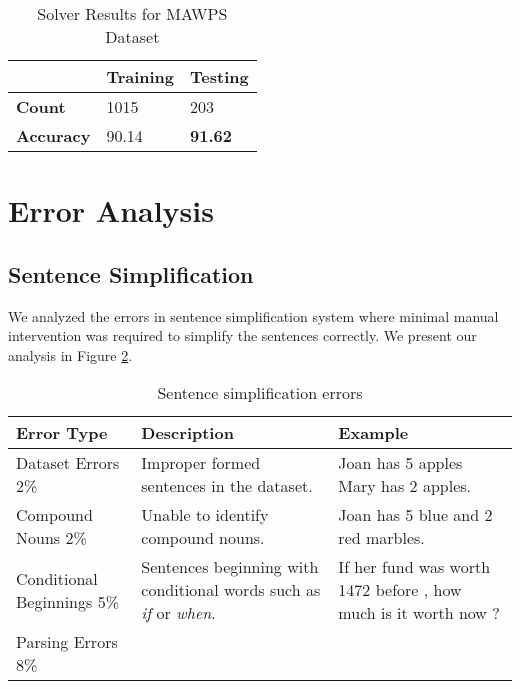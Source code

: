 \documentclass[11pt]{article}
\begin{document}
\begin{table}[H]
\centering
\begin{tabular}{|m{3cm}|m{2cm}|m{1.5cm}|}
\hline
 & \textbf{Training} & \textbf{Testing} \\ \hline
 \textbf{Count} & 1015 & 203 \\ \hline
 \textbf{Accuracy} & 90.14 & \textbf{91.62} \\ \hline
\end{tabular}
\caption{Solver Results for MAWPS Dataset}
\label{figure:14}
\end{table}

\section{Error Analysis}
\subsection{Sentence Simplification}
We analyzed the errors in sentence simplification system where minimal manual intervention was required to simplify the sentences correctly. We present our analysis in Figure \ref{figure:15}. 

\begin{table}[h!]
\centering
\begin{tabular}{|m{2cm}|m{2cm}|m{2cm}|}
\hline
\textbf{Error Type} & \textbf{Description} & \textbf{Example}  \\ \hline
Dataset Errors 2\% & Improper formed sentences in the dataset. & Joan has 5 apples Mary has 2 apples. \\ \hline
Compound Nouns 2\% & Unable to identify compound nouns. & Joan has 5 blue and 2 red marbles. \\ \hline
Conditional Beginnings 5\% & Sentences beginning with conditional words such as \textit{if} or \textit{when}. & If her fund was worth 1472 before , how much is it worth now ? \\ \hline
Parsing Errors 8\% &  & \\ \hline
\end{tabular}
\caption{Sentence simplification errors}
\label{figure:15}
\end{table}
\end{document}
